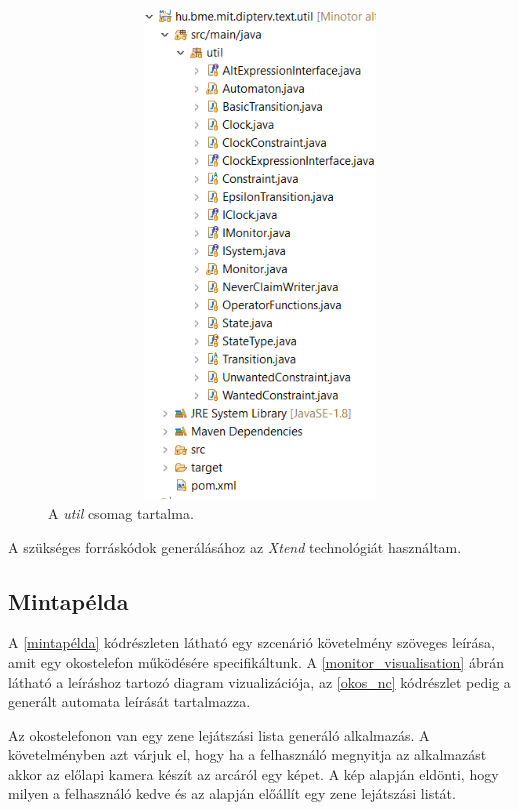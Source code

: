 \begin{figure}[!ht]
    \centering
    \includegraphics[width=180mm, height= 13cm, keepaspectratio]{figures/util_csomag.png}
    \caption{A \textit{util} csomag tartalma.}
	\label{util_csomag}
\end{figure}

A szükséges forráskódok generálásához az \textit{Xtend} technológiát használtam.

\clearpage\subsection{Mintapélda}

A \ref{mintapélda} kódrészleten látható egy szcenárió követelmény szöveges leírása, amit egy okostelefon működésére specifikáltunk.
A \ref{monitor_visualisation} ábrán látható a leíráshoz tartozó diagram vizualizációja, az \ref{okos_nc} kódrészlet pedig a generált automata leírását tartalmazza.

Az okostelefonon van egy zene lejátszási lista generáló alkalmazás.
A követelményben azt várjuk el, hogy ha a felhasználó megnyitja az alkalmazást akkor az előlapi kamera készít az arcáról egy képet.
A kép alapján eldönti, hogy milyen a felhasználó kedve és az alapján előállít egy zene lejátszási listát.

